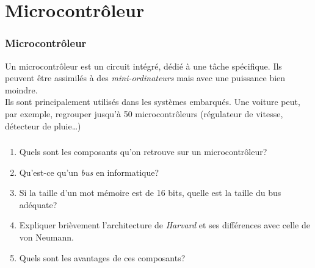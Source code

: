 \documentclass[svgnames,11pt]{beamer}
\begin{document}
\section{Microcontrôleur}
\begin{frame}
    \frametitle{Microcontrôleur}

    \begin{aretenir}[]
    Un microcontrôleur est un circuit intégré, dédié à une tâche spécifique. Ils peuvent être assimilés à des \emph{mini-ordinateurs} mais avec une puissance bien moindre.\\Ils sont principalement utilisés dans les systèmes embarqués. Une voiture peut, par exemple, regrouper jusqu'à 50 microcontrôleurs (régulateur de vitesse, détecteur de pluie\dots)
    \end{aretenir}

\end{frame}
\begin{frame}
    \frametitle{}

    \begin{activite}
    \begin{enumerate}
        \item Quels sont les composants qu'on retrouve sur un microcontrôleur?
        \item Qu'est-ce qu'un \emph{bus} en informatique?
        \item Si la taille d'un mot mémoire est de 16 bits, quelle est la taille du bus adéquate?
        \item Expliquer brièvement l'architecture de \emph{Harvard} et ses différences avec celle de von Neumann.
        \item Quels sont les avantages de ces composants?
    \end{enumerate}
    \end{activite}
\end{frame}
\end{document}
